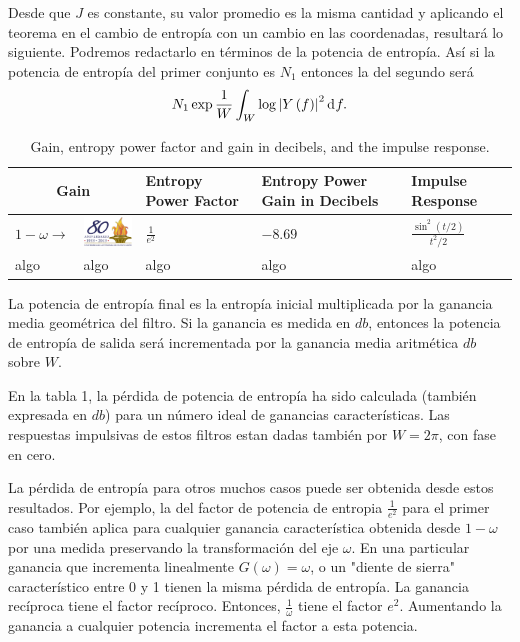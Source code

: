 Desde que $J$ es constante, su valor promedio es la misma cantidad y
aplicando el teorema en el cambio de entrop\'ia con un cambio en las
coordenadas, resultar\'a lo siguiente. Podremos redactarlo en
t\'erminos de la potencia de entrop\'ia. As\'i si la potencia de
entrop\'ia del primer conjunto es $N_{1}$ entonces la del segundo
ser\'a
\begin{equation}
N_{1}\exp \frac{1}{W}\int_{W}^{\:}\log \left | Y\left ( f \right )
\right |^{2} \diff f.
\end{equation}

\begin{table}[!ht]
\caption{Gain, entropy power factor and gain in decibels, and the impulse response.}
\label{table1}
\begin{center}
\begin{tabular}{|m{15mm}m{20mm}|m{15mm}|m{35mm}|m{40mm}|}
\hline
\multicolumn{2}{|c|}{\sc Gain} & {\sc Entropy Power Factor} & {\sc Entropy Power Gain in
Decibels} & {\sc Impulse Response} \\
\hline
$1 - \omega \longrightarrow$ & \includegraphics[width=20mm]{ejemplo.png}
& $\frac{1}{e^2}$ & $-8.69$ & $\frac{\sin^2(t/2)}{t^2 / 2}$ \\
\hline
algo & algo & algo & algo & algo \\
\hline
\end{tabular}
\end{center}
\end{table}

La potencia de entrop\'ia final es la entrop\'ia inicial multiplicada
por la ganancia media geom\'etrica del filtro. Si la ganancia es
medida en $db$, entonces la potencia de entrop\'ia de salida ser\'a
incrementada por la ganancia media aritm\'etica $db$ sobre $W$.

En la tabla 1, la p\'erdida de potencia de entrop\'ia ha sido
calculada (tambi\'en expresada en $db$) para un n\'umero ideal de
ganancias caracter\'isticas. Las respuestas impulsivas de estos
filtros estan dadas tambi\'en por $W = 2 \pi$, con fase en cero.

La p\'erdida de entrop\'ia para otros muchos casos puede ser obtenida
desde estos resultados. Por ejemplo, la del factor de potencia de
entrop\;ia $\frac{1}{e^{2}}$ para el primer caso tambi\'en aplica para
cualquier ganancia caracter\'istica obtenida desde $1-\omega$ por una
medida preservando la transformaci\'on del eje $\omega$. En una
particular ganancia que incrementa linealmente $G \left (\omega
\right) = \omega$, o un "diente de sierra" caracter\'istico entre 0 y
1 tienen la misma p\'erdida de entrop\'ia. La ganancia rec\'iproca
tiene el factor rec\'iproco. Entonces, $\frac{1}{\omega}$ tiene el
factor $e^{2}$. Aumentando la ganancia a cualquier potencia incrementa
el factor a esta potencia. 

